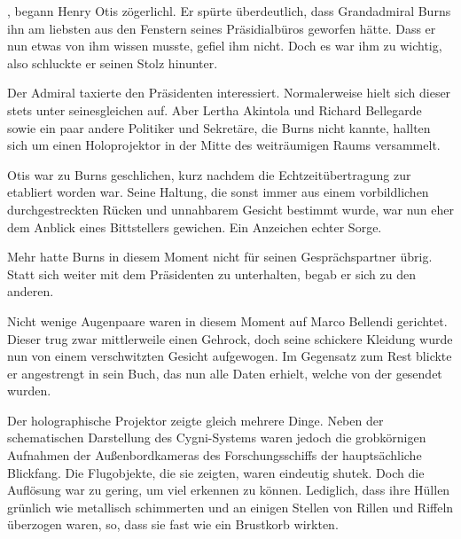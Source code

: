 , begann Henry Otis zögerlichl. Er spürte überdeutlich, dass Grandadmiral Burns ihn am liebsten aus den Fenstern seines Präsidialbüros geworfen hätte. Dass er nun etwas von ihm wissen musste, gefiel ihm nicht. Doch es war ihm zu wichtig, also schluckte er seinen Stolz hinunter. 

\par

Der Admiral taxierte den Präsidenten interessiert. Normalerweise hielt sich dieser stets unter seinesgleichen auf. Aber Lertha Akintola und Richard Bellegarde sowie ein paar andere Politiker und Sekretäre, die Burns nicht kannte, hallten sich um einen Holoprojektor in der Mitte des weiträumigen Raums versammelt.

\par

Otis war zu Burns geschlichen, kurz nachdem die Echtzeitübertragung zur  etabliert worden war. Seine Haltung, die sonst immer aus einem vorbildlichen durchgestreckten Rücken und unnahbarem Gesicht bestimmt wurde, war nun eher dem Anblick eines Bittstellers gewichen. Ein Anzeichen echter Sorge.

\par

 Mehr hatte Burns in diesem Moment nicht für seinen Gesprächspartner übrig. Statt sich weiter mit dem Präsidenten zu unterhalten, begab er sich zu den anderen.

\par

Nicht wenige Augenpaare waren in diesem Moment auf Marco Bellendi gerichtet. Dieser trug zwar mittlerweile einen Gehrock, doch seine schickere Kleidung wurde nun von einem verschwitzten Gesicht aufgewogen. Im Gegensatz zum Rest blickte er angestrengt in sein Buch, das nun alle Daten erhielt, welche von der  gesendet wurden.

\par

Der holographische Projektor zeigte gleich mehrere Dinge. Neben der schematischen Darstellung des Cygni-Systems waren jedoch die grobkörnigen Aufnahmen der Außenbordkameras des Forschungsschiffs der hauptsächliche Blickfang. Die Flugobjekte, die sie zeigten, waren eindeutig shutek. Doch die Auflösung war zu gering, um viel erkennen zu können. Lediglich, dass ihre Hüllen grünlich wie metallisch schimmerten und an einigen Stellen von Rillen und Riffeln überzogen waren, so, dass sie fast wie ein Brustkorb wirkten.

